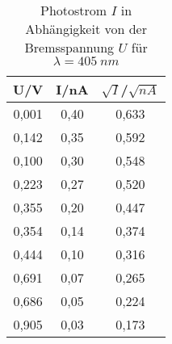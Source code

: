 \begin{table}[h!]
  \centering
  \caption{Photostrom $I$ in Abhängigkeit von der Bremsspannung $U$ für $\lambda=\SI{405}{nm}$}
  \label{tab:v405}
  \begin{tabular}{c c c}
    \toprule
      U/V & I/nA  & $\sqrt{I}$/$\sqrt{nA}$  \\
    \midrule
      0,001 & 0,40 & 0,633 \\
      0,142 & 0,35 & 0,592 \\
      0,100 & 0,30 & 0,548 \\
      0,223 & 0,27 & 0,520 \\
      0,355 & 0,20 & 0,447 \\
      0,354 & 0,14 & 0,374 \\
      0,444 & 0,10 & 0,316 \\
      0,691 & 0,07 & 0,265 \\
      0,686 & 0,05 & 0,224 \\
      0,905 & 0,03 & 0,173 \\

    \bottomrule
  \end{tabular}
\end{table}
